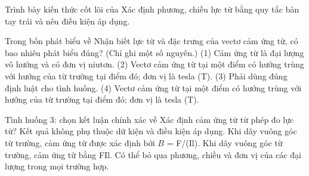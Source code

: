 \begin{bt}
Trình bày kiến thức cốt lõi của Xác định phương, chiều lực từ bằng quy tắc bàn tay trái và nêu điều kiện áp dụng.
\end{bt}

\begin{ex}
Trong bốn phát biểu về Nhận biết lực từ và đặc trưng của vectơ cảm ứng từ, có bao nhiêu phát biểu đúng? (Chỉ ghi một số nguyên.) (1) Cảm ứng từ là đại lượng vô hướng và có đơn vị niutơn. (2) Vectơ cảm ứng từ tại một điểm có hướng trùng với hướng của từ trường tại điểm đó; đơn vị là tesla (T). (3) Phải dùng đúng định luật cho tình huống. (4) Vectơ cảm ứng từ tại một điểm có hướng trùng với hướng của từ trường tại điểm đó; đơn vị là tesla (T).
\end{ex}

\begin{ex}
Tình huống 3: chọn kết luận chính xác về Xác định cảm ứng từ từ phép đo lực từ?
\choice
{Kết quả không phụ thuộc dữ kiện và điều kiện áp dụng.}
{\True Khi dây vuông góc từ trường, cảm ứng từ được xác định bởi $B$ = F/(Il).}
{Khi dây vuông góc từ trường, cảm ứng từ bằng FIl.}
{Có thể bỏ qua phương, chiều và đơn vị của các đại lượng trong mọi trường hợp.}
\end{ex}

